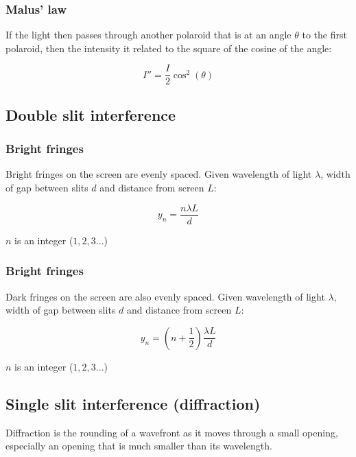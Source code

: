 \documentclass[12pt]{article}
\begin{document}
\subsubsection{Malus' law}

If the light then passes through another polaroid that is at an angle $\theta$ to the first polaroid, then the intensity it related to the square of the cosine of the angle:

\[
\boxed{
I'' = \frac{I}{2}\cos^2 (\theta)
}
\]

\subsection{Double slit interference}

\subsubsection{Bright fringes}

Bright fringes on the screen are evenly spaced.
Given wavelength of light $\lambda$, width of gap between slits $d$ and distance from screen $L$:

\[
\boxed{
y_n = \frac{n\lambda L}{d}
}
\]

$n$ is an integer ($1, 2, 3 ...$)

\subsubsection{Bright fringes}

Dark fringes on the screen are also evenly spaced.
Given wavelength of light $\lambda$, width of gap between slits $d$ and distance from screen $L$:

\[
\boxed{
y_n = \left(n + \frac{1}{2}\right)\frac{\lambda L}{d}
}
\]

$n$ is an integer ($1, 2, 3 ...$)

\newpage

\subsection{Single slit interference (diffraction)}

Diffraction is the rounding of a wavefront as it moves through a small opening, especially an opening that is much smaller than its wavelength.
\end{document}
